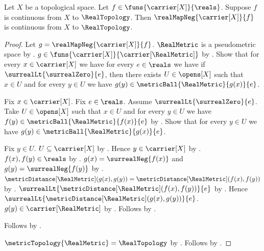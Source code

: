 \begin{theorem}\label{real_map_neg_continuous}
    Let $X$ be a topological space.
    Let $f\in\funs{\carrier[X]}{\reals}$.
    Suppose $f$ is continuous from $X$ to $\RealTopology$.
    Then $\realMapNeg{\carrier[X]}{f}$ is continuous from $X$ to
        $\RealTopology$.
\end{theorem}
\begin{proof}
    Let $g=\realMapNeg{\carrier[X]}{f}$.
    $\RealMetric$ is a pseudometric space by
        .
    $g\in\funs{\carrier[X]}{\carrier[\RealMetric]}$
        by
        .
    Show that for every $x\in\carrier[X]$ we have
        for every $e\in\reals$ we have if
            $\surrealLt{\surrealZero}{e}$, then there exists
            $U\in\opens[X]$ such that $x\in U$ and
            for every $y\in U$ we have
                $g(y)\in\metricBall{\RealMetric}{g(x)}{e}$.
    \begin{subproof}
        Fix $x\in\carrier[X]$.
        Fix $e\in\reals$.
        Assume $\surrealLt{\surrealZero}{e}$.
        Take $U\in\opens[X]$ such that $x\in U$ and
            for every $y\in U$ we have
                $f(y)\in\metricBall{\RealMetric}{f(x)}{e}$
            by
            .
        Show that for every $y\in U$ we have
            $g(y)\in\metricBall{\RealMetric}{g(x)}{e}$.
        \begin{subproof}
            Fix $y\in U$.
            $U\subseteq\carrier[X]$ by .
            Hence $y\in\carrier[X]$ by .
            $f(x),f(y)\in\reals$ by .
            $g(x)=\surrealNeg{f(x)}$ and $g(y)=\surrealNeg{f(y)}$
                by .
            $\metricDistance[\RealMetric](g(x),g(y))
                =\metricDistance[\RealMetric](f(x),f(y))$
                by .
            $\surrealLt{\metricDistance[\RealMetric](f(x),f(y))}{e}$
                by .
            Hence $\surrealLt{\metricDistance[\RealMetric](g(x),g(y))}{e}$.
            $g(y)\in\carrier[\RealMetric]$
                by .
            Follows by .
        \end{subproof}
        Follows by \auto.
    \end{subproof}
    $\metricTopology{\RealMetric}=\RealTopology$
        by .
    Follows by .
\end{proof}

